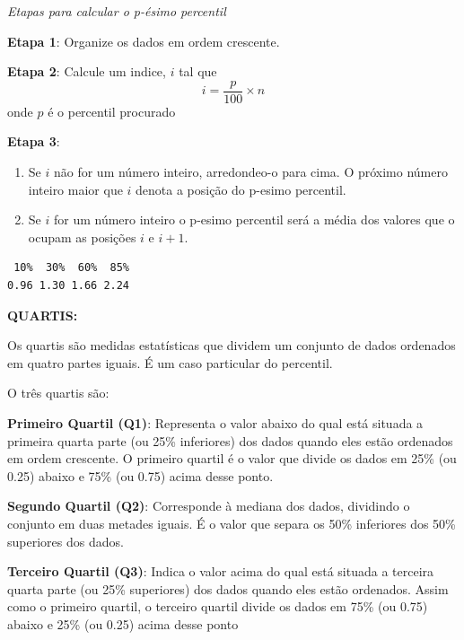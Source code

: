 \documentclass[
  letterpaper,
  DIV=11,
  numbers=noendperiod]{scrreprt}
\newenvironment{Shaded}{\begin{snugshade}}{\end{snugshade}}
\newcommand{\AttributeTok}[1]{\textcolor[rgb]{0.40,0.45,0.13}{#1}}
\newcommand{\FloatTok}[1]{\textcolor[rgb]{0.68,0.00,0.00}{#1}}
\newcommand{\FunctionTok}[1]{\textcolor[rgb]{0.28,0.35,0.67}{#1}}
\newcommand{\NormalTok}[1]{\textcolor[rgb]{0.00,0.23,0.31}{#1}}
\newcommand{\SpecialCharTok}[1]{\textcolor[rgb]{0.37,0.37,0.37}{#1}}
\providecommand{\tightlist}{%
  \setlength{\itemsep}{0pt}\setlength{\parskip}{0pt}}
\begin{document}
\emph{Etapas para calcular o p-ésimo percentil}

\textbf{Etapa 1}: Organize os dados em ordem crescente.

\textbf{Etapa 2}: Calcule um indice, \(i\) tal que
\[i = \frac{p}{100} \times n\] onde \(p\) é o percentil procurado

\textbf{Etapa 3}:

\begin{enumerate}
\def\labelenumi{\alph{enumi})}
\tightlist
\item
  Se \(i\) não for um número inteiro, arredondeo-o para cima. O próximo
  número inteiro maior que \(i\) denota a posição do p-esimo percentil.
\item
  Se \(i\) for um número inteiro o p-esimo percentil será a média dos
  valores que o ocupam as posições \(i\) e \(i + 1\).
\end{enumerate}

\begin{Shaded}
\end{Shaded}

\begin{verbatim}
 10%  30%  60%  85% 
0.96 1.30 1.66 2.24 
\end{verbatim}

\textbf{QUARTIS:}

Os quartis são medidas estatísticas que dividem um conjunto de dados
ordenados em quatro partes iguais. É um caso particular do percentil.

O três quartis são:

\textbf{Primeiro Quartil (Q1)}: Representa o valor abaixo do qual está
situada a primeira quarta parte (ou 25\% inferiores) dos dados quando
eles estão ordenados em ordem crescente. O primeiro quartil é o valor
que divide os dados em 25\% (ou 0.25) abaixo e 75\% (ou 0.75) acima
desse ponto.

\textbf{Segundo Quartil (Q2)}: Corresponde à mediana dos dados,
dividindo o conjunto em duas metades iguais. É o valor que separa os
50\% inferiores dos 50\% superiores dos dados.

\textbf{Terceiro Quartil (Q3)}: Indica o valor acima do qual está
situada a terceira quarta parte (ou 25\% superiores) dos dados quando
eles estão ordenados. Assim como o primeiro quartil, o terceiro quartil
divide os dados em 75\% (ou 0.75) abaixo e 25\% (ou 0.25) acima desse
ponto
\end{document}
